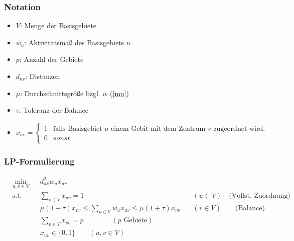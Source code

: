         \subsubsection{Notation} %
        \label{ssub:notation}

          \begin{itemize}
            \item $V$: Menge der Basisgebiete
            \item $w_u$: Aktivitätsmaß des Basisgebiets $u$
            \item $p$: Anzahl der Gebiete
            \item $d_{uv}$: Distanzen
            \item $\mu$: Durchschnittsgröße bzgl. $w$ (\eqref{mu})
            \item $\tau$: Toleranz der Balance
            \item \begin{equation*}
                        x_{uv} = 
                        \begin{cases}
                          1 & \text{falls Basisgebiet } u \text{ einem Gebit mit dem Zentrum } v \text{ zugeordnet wird.} \\
                          0 & sonst
                        \end{cases}
                    \label{trivial wage scheme}
                \end{equation*}
          \end{itemize}
        

        \subsubsection{LP-Formulierung} %
        \label{ssub:lp_formulierung}

          \begin{equation*}
            \begin{aligned}
              & \underset{u,v \in V}{\text{min}}
              & & d_{uv}^2w_{u}x_{uv}\\
              & \text{s.t.}
              & & \sum_{v \in V}x_{uv} = 1 & \quad (u \in V) \quad \text{(Vollst. Zuordnung)}\\ 
              & & & \mu(1 - \tau)x_{vv} \leq \sum_{u \in V}w_ux_{uv} \leq \mu(1 + \tau)x_{vv} &\quad  (v \in V)\quad \quad \text{(Balance)} \\
              & & &\sum_{v \in V}x_{vv} = p \qquad \qquad(p \text{ Gebiete})\\
              & & &x_{uv} \in \{0, 1\}  \qquad (u, v \in V)
            \end{aligned}
            \label{LEN principal problem}
          \end{equation*}
        
